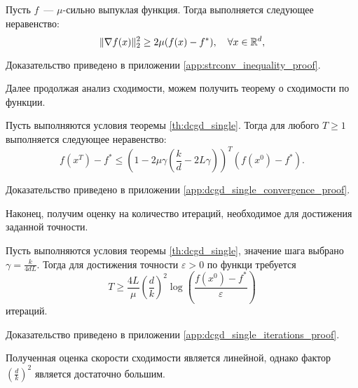    \begin{lemma}\label{lem:strconv_inequality}
        Пусть $f$~--- $\mu$-сильно выпуклая функция. Тогда выполняется следующее неравенство:
        \begin{equation}\label{eq:strconv_inequality}
            \|\nabla f(x)\|_2^2 \geq 2\mu (f(x) - f^*), \quad \forall x \in \mathbb{R}^d,
        \end{equation}
    \end{lemma}
    Доказательство приведено в приложении \ref{app:strconv_inequality_proof}.

    Далее продолжая анализ сходимости, можем получить теорему о сходимости по функции.

    \begin{theorem}\label{th:dcgd_single_convergence}
        Пусть выполняются условия теоремы \ref{th:dcgd_single}. Тогда для любого $T \geq 1$ выполняется следующее неравенство:
        \begin{equation}
            f(x^T) - f^* \leq \left(1 - 2\mu \gamma \left(\frac{k}{d} - 2 L \gamma\right)\right)^T (f(x^0) - f^*).
        \end{equation}
    \end{theorem}
    Доказательство приведено в приложении \ref{app:dcgd_single_convergence_proof}.

    Наконец, получим оценку на количество итераций, необходимое для достижения заданной точности.
    \begin{corollary}\label{cor:dcgd_single_iterations}
        Пусть выполняются условия теоремы \ref{th:dcgd_single}, значение шага выбрано $\gamma = \frac{k}{4dL}$. Тогда для достижения точности $\varepsilon > 0$ по функци требуется
        \begin{equation}
            T \geq \frac{4L}{\mu} \left(\frac{d}{k}\right)^2 \log\left(\frac{f(x^0) - f^*}{\varepsilon}\right)
        \end{equation}
        итераций.
    \end{corollary}
    Доказательство приведено в приложении \ref{app:dcgd_single_iterations_proof}.

    Полученная оценка скорости сходимости является линейной, однако фактор $(\frac{d}{k})^2$ является достаточно большим.

